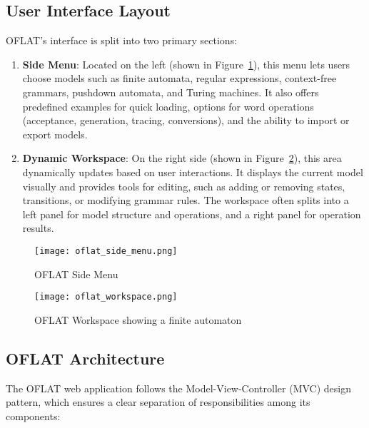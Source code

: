 \subsection{User Interface Layout}

OFLAT's interface is split into two primary sections:
\begin{enumerate}
\item \textbf{Side Menu}: Located on the left (shown in Figure~\ref{fig:oflat_side_menu}), 
this menu lets users choose models such as finite automata, regular expressions, context-free grammars, pushdown automata, and Turing machines. 
It also offers predefined examples for quick loading, options for word operations (acceptance, generation, tracing, conversions), and the ability to import or export models.
\item \textbf{Dynamic Workspace}: On the right side (shown in Figure~\ref{fig:oflat_workspace}), this area dynamically updates based on user interactions. 
It displays the current model visually and provides tools for editing, such as adding or removing states, transitions, or modifying grammar rules. 
The workspace often splits into a left panel for model structure and operations, and a right panel for operation results.
\end{enumerate}

\begin{figure}[htbp]
    \centering
    \texttt{[image: oflat\_side\_menu.png]}
    \caption{OFLAT Side Menu}
    \label{fig:oflat_side_menu}
\end{figure}

\begin{figure}[htbp]
    \centering
    \texttt{[image: oflat\_workspace.png]}
    \caption{OFLAT Workspace showing a finite automaton}
    \label{fig:oflat_workspace}
\end{figure}

\subsection{OFLAT Architecture}

The OFLAT web application follows the Model-View-Controller (MVC) design pattern, 
which ensures a clear separation of responsibilities among its components:

